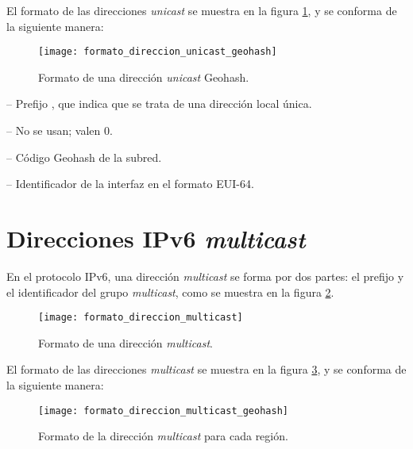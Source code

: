 El formato de las direcciones \textit{unicast} se muestra en la figura
\ref{fig:formato_direccion_unicast_geohash}, y se conforma de la siguiente
manera:

\begin{figure}[th!]
\centering
\texttt{[image: formato\_direccion\_unicast\_geohash]}
\decoRule
\caption[Formato de una dirección \textit{unicast} Geohash]{Formato de una
dirección \textit{unicast} Geohash.}
\label{fig:formato_direccion_unicast_geohash}
\end{figure}

 -- Prefijo , que indica que se trata de
una dirección local única.

 -- No se usan; valen 0.

 -- Código Geohash de la subred.

 -- Identificador de la interfaz en el formato
EUI-64.

\section{Direcciones IPv6 \textit{multicast}}
\label{subsec:direcciones_ipv6_multicast}

En el protocolo IPv6, una dirección \textit{multicast} se forma por dos partes:
el prefijo  y el identificador del grupo \textit{multicast},
como se muestra en la figura \ref{fig:formato_direccion_multicast}.

\begin{figure}[th!]
\centering
\texttt{[image: formato\_direccion\_multicast]}
\decoRule
\caption[Formato de una dirección \textit{multicast}]{Formato de una dirección
\textit{multicast}.}
\label{fig:formato_direccion_multicast}
\end{figure}

El formato de las direcciones \textit{multicast} se muestra en la figura
\ref{fig:formato_direccion_multicast_geohash}, y se conforma de la siguiente
manera:

\begin{figure}[th!]
\centering
\texttt{[image: formato\_direccion\_multicast\_geohash]}
\decoRule
\caption[Formato de la dirección \textit{multicast} para cada región]{Formato de
la dirección \textit{multicast} para cada región.}
\label{fig:formato_direccion_multicast_geohash}
\end{figure}

